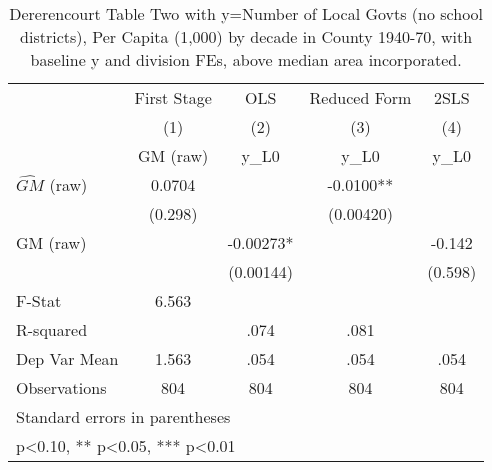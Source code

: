 \begin{table}[htbp]\centering
\def\sym#1{\ifmmode^{#1}\else\(^{#1}\)\fi}
\caption{Dererencourt Table Two with y=Number of Local Govts (no school districts), Per Capita (1,000) by decade in County 1940-70, with baseline y and division FEs, above median area incorporated.}
\begin{tabular}{l*{4}{c}}
\toprule
                    & First Stage   &         OLS   &Reduced Form   &        2SLS   \\
                    &\multicolumn{1}{c}{(1)}&\multicolumn{1}{c}{(2)}&\multicolumn{1}{c}{(3)}&\multicolumn{1}{c}{(4)}\\
                    &\multicolumn{1}{c}{GM  (raw)}&\multicolumn{1}{c}{y\_L0}&\multicolumn{1}{c}{y\_L0}&\multicolumn{1}{c}{y\_L0}\\
\midrule
$\hat{GM}$ (raw)    &      0.0704   &               &     -0.0100** &               \\
                    &     (0.298)   &               &   (0.00420)   &               \\
\addlinespace
GM  (raw)           &               &    -0.00273*  &               &      -0.142   \\
                    &               &   (0.00144)   &               &     (0.598)   \\
\midrule
F-Stat              &       6.563   &               &               &               \\
R-squared           &               &        .074   &        .081   &               \\
Dep Var Mean        &       1.563   &        .054   &        .054   &        .054   \\
Observations        &         804   &         804   &         804   &         804   \\
\bottomrule
\multicolumn{5}{l}{\footnotesize Standard errors in parentheses}\\
\multicolumn{5}{l}{\footnotesize * p<0.10, ** p<0.05, *** p<0.01}\\
\end{tabular}
\end{table}
